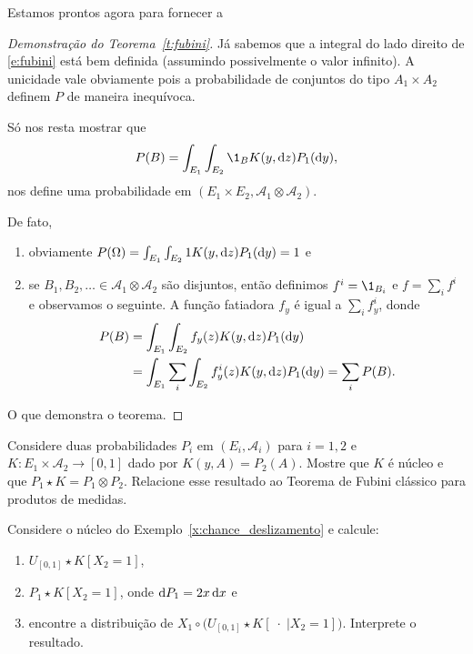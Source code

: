 Estamos prontos agora para fornecer a
\begin{proof}[Demonstração do Teorema~\ref{t:fubini}]
  Já sabemos que a integral do lado direito de \eqref{e:fubini} está bem definida (assumindo possivelmente o valor infinito).
  A unicidade vale obviamente pois a probabilidade de conjuntos do tipo $A_1 \times A_2$ definem $P$ de maneira inequívoca.


  Só nos resta mostrar que
  \begin{equation}
    P(B) = \int_{E_1} \int_{E_2} \1_{B} K(y, \d z) P_1 (\d y),
  \end{equation}
  nos define uma probabilidade em $(E_1 \times E_2, \mathcal{A}_1 \otimes \mathcal{A}_2)$.

  De fato,
  \begin{enumerate}[\quad a)]
  \item obviamente $P(\Omega) = \int_{E_1} \int_{E_2} 1 K(y, \mathop{}\!\mathrm{d} z) P_1(\mathop{}\!\mathrm{d} y) = 1$ e
  \item se $B_1, B_2, \dots \in \mathcal{A}_1 \otimes \mathcal{A}_2$ são disjuntos, então definimos $f^i = \1_{B_i}$ e $f = \sum_i f^i$ e observamos o seguinte.
    A função fatiadora $f_y$ é igual a $\sum_i f^i_y$, donde
    \begin{equation}
      \begin{split}
        P(B) & = \int_{E_1} \int_{E_2} f_y(z) K(y, \mathop{}\!\mathrm{d} z) P_1(\mathop{}\!\mathrm{d} y)\\
        & = \int_{E_1} \sum_i \int_{E_2} f^i_y(z) K(y, \mathop{}\!\mathrm{d} z) P_1(\mathop{}\!\mathrm{d} y) = \sum_i P(B).
      \end{split}
    \end{equation}
  \end{enumerate}
  O que demonstra o teorema.
\end{proof}

\begin{exercise}
  Considere duas probabilidades $P_i$ em $(E_i, \mathcal{A}_i)$ para $i = 1,2$ e $K:E_1 \times \mathcal{A}_2 \to [0,1]$ dado por $K(y,A) = P_2(A)$.
  Mostre que $K$ é núcleo e que $P_1 \star K = P_1 \otimes P_2$.
  Relacione esse resultado ao Teorema de Fubini clássico para produtos de medidas.
\end{exercise}

\begin{exercise}
  Considere o núcleo do Exemplo~\ref{x:chance_deslizamento} e calcule:
  \begin{enumerate}[\quad a)]
  \item $U_{[0,1]} \star K [X_2 = 1]$,
  \item $P_1 \star K [X_2 = 1]$, onde $\mathop{}\!\mathrm{d} P_1 = 2x \mathop{}\!\mathrm{d} x$ e
  \item encontre a distribuição de $X_1 \circ \big( U_{[0,1]} \star K [\; \cdot \; | X_2 = 1] \big)$. Interprete o resultado.
  \end{enumerate}
\end{exercise}

